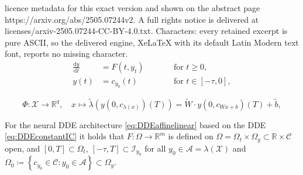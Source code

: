 \documentclass[10pt,a4paper]{amsart}
\newcommand*{\dd}{\mathrm{d}}
\begin{document}
licence metadata for this exact version and shown on the abstract page https://arxiv.org/abs/2505.07244v2. A full rights notice is delivered at licenses/arxiv-2505.07244-CC-BY-4.0.txt. Characters: every retained excerpt is pure ASCII, so the delivered engine, XeLaTeX with its default Latin Modern text font, reports no missing character.
	\begin{equation} \label{eq:DDEconstantIC}
		\begin{aligned}
			\frac{\dd y}{\dd t} &= F(t,y_t) \qquad &&\text{for } t\geq 0, \\  
			y(t) &= c_{y_0}(t) &&\text{for } t \in [-\tau,0],
		\end{aligned}
	\end{equation}

	\begin{equation}\label{eq:DDEaffinelinear}
		\Phi: \mathcal{X} \rightarrow \mathbb{R}^q, \quad x \mapsto \tilde{\lambda}(y(0,c_{\lambda(x)})(T)) = \widetilde{W} \cdot y(0,c_{Wx+b})(T) + \tilde{b} ,
	\end{equation}

	\begin{assumption}\label{ass:vectorfield}
		For the neural DDE architecture \eqref{eq:DDEaffinelinear} based on the DDE \eqref{eq:DDEconstantIC} it holds that $F:\Omega\rightarrow\mathbb{R}^m$ is defined on $\Omega = \Omega_t \times \Omega_y \subset \mathbb{R}\times \mathcal{C}$ open, and $[0,T]\subset \Omega_t $, $[-\tau,T]\subset \mathcal{I}_{y_0}$ for all $y_0\in \mathcal{A} = \lambda(\mathcal{X})$ and $\Omega_0 \coloneqq \left\{c_{y_0}\in \mathcal{C}: y_0 \in \mathcal{A}\right\} \subset \Omega_y$.
	\end{assumption}
\end{document}
